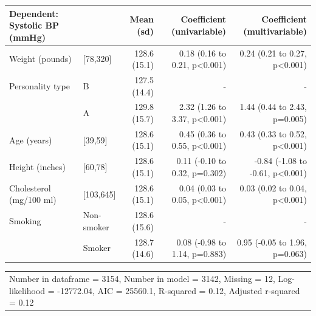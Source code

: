 \documentclass[12pt,]{krantz}
\makeatletter
\newenvironment{Shaded}{\begin{snugshade}}{\end{snugshade}}
\newcommand{\DataTypeTok}[1]{\textcolor[rgb]{0.13,0.29,0.53}{#1}}
\newcommand{\KeywordTok}[1]{\textcolor[rgb]{0.13,0.29,0.53}{\textbf{#1}}}
\newcommand{\NormalTok}[1]{#1}
\newcommand{\OperatorTok}[1]{\textcolor[rgb]{0.81,0.36,0.00}{\textbf{#1}}}
\newcommand{\OtherTok}[1]{\textcolor[rgb]{0.56,0.35,0.01}{#1}}
\newcommand{\StringTok}[1]{\textcolor[rgb]{0.31,0.60,0.02}{#1}}
\newenvironment{kframe}{%
\medskip{}
\setlength{\fboxsep}{.8em}
 \def\at@end@of@kframe{}%
 \ifinner\ifhmode%
  \def\at@end@of@kframe{\end{minipage}}%
  \begin{minipage}{\columnwidth}%
 \fi\fi%
 \def\FrameCommand##1{\hskip\@totalleftmargin \hskip-\fboxsep
 \colorbox{shadecolor}{##1}\hskip-\fboxsep
     \hskip-\linewidth \hskip-\@totalleftmargin \hskip\columnwidth}%
 \MakeFramed {\advance\hsize-\width
   \@totalleftmargin\z@ \linewidth\hsize
   \@setminipage}}%
 {\par\unskip\endMakeFramed%
 \at@end@of@kframe}
\renewenvironment{Shaded}{\begin{kframe}}{\end{kframe}}
\theoremstyle{definition}
\theoremstyle{definition}
\theoremstyle{definition}
\theoremstyle{remark}
\makeatother
\begin{document}
\begin{tabular}{llrrr}
\toprule
Dependent: Systolic BP (mmHg) &  & Mean (sd) & Coefficient (univariable) & Coefficient (multivariable)\\
\midrule
Weight (pounds) & [78,320] & 128.6 (15.1) & 0.18 (0.16 to 0.21, p<0.001) & 0.24 (0.21 to 0.27, p<0.001)\\
Personality type & B & 127.5 (14.4) & - & -\\
 & A & 129.8 (15.7) & 2.32 (1.26 to 3.37, p<0.001) & 1.44 (0.44 to 2.43, p=0.005)\\
Age (years) & [39,59] & 128.6 (15.1) & 0.45 (0.36 to 0.55, p<0.001) & 0.43 (0.33 to 0.52, p<0.001)\\
Height (inches) & [60,78] & 128.6 (15.1) & 0.11 (-0.10 to 0.32, p=0.302) & -0.84 (-1.08 to -0.61, p<0.001)\\
\addlinespace
Cholesterol (mg/100 ml) & [103,645] & 128.6 (15.1) & 0.04 (0.03 to 0.05, p<0.001) & 0.03 (0.02 to 0.04, p<0.001)\\
Smoking & Non-smoker & 128.6 (15.6) & - & -\\
 & Smoker & 128.7 (14.6) & 0.08 (-0.98 to 1.14, p=0.883) & 0.95 (-0.05 to 1.96, p=0.063)\\
\bottomrule
\end{tabular}

\begin{tabular}{l}
\toprule
\\
\midrule
Number in dataframe = 3154, Number in model = 3142, Missing = 12, Log-likelihood = -12772.04, AIC = 25560.1, R-squared = 0.12, Adjusted r-squared = 0.12\\
\bottomrule
\end{tabular}

\begin{Shaded}
\end{Shaded}
\end{document}
